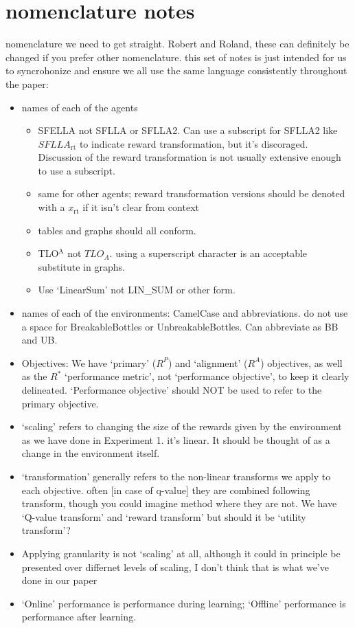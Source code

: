 \section*{nomenclature notes}
nomenclature we need to get straight. Robert and Roland, these can definitely be changed if you prefer other nomenclature. this set of notes is just intended for us to syncrohonize and ensure we all use the same language consistently throughout the paper:

\begin{itemize}
    \item names of each of the agents
        \begin{itemize}
            \item SFELLA not SFLLA or SFLLA2. Can use a subscript for SFLLA2 like $SFLLA_{\text{rt}}$ to indicate reward transformation, but it's discoraged. Discussion of the reward transformation is not usually extensive enough to use a subscript. 
            \item same for other agents; reward transformation versions should be denoted with a $x_{\text{rt}}$ if it isn't clear from context
            \item tables and graphs should all conform.
            \item TLO$^\text{A}$ not $TLO_A$. using a superscript character is an acceptable substitute in graphs.
            \item Use `LinearSum' not LIN\_SUM or other form.
        \end{itemize}
    \item names of each of the environments: CamelCase and abbreviations. do not use a space for BreakableBottles or UnbreakableBottles. Can abbreviate as BB and UB. 
    \item Objectives: We have `primary' ($R^P$) and `alignment' ($R^A$) objectives, as well as the $R^*$ `performance metric', not `performance objective', to keep it clearly delineated. `Performance objective' should NOT be used to refer to the primary objective.
    \item `scaling' refers to changing the size of the rewards given by the environment as we have done in Experiment 1. it's linear. It should be thought of as a change in the environment itself.
    \item `transformation' generally refers to the non-linear transforms we apply to each objective. often [in case of q-value] they are combined following transform, though you could imagine method where they are not. We have `Q-value transform' and `reward transform' but should it be `utility transform'?
    \item Applying granularity is not `scaling' at all, although it could in principle be presented over differnet levels of scaling, I don't think that is what we've done in our paper
    \item `Online' performance is performance during learning; `Offline' performance is performance after learning.
\end{itemize}

